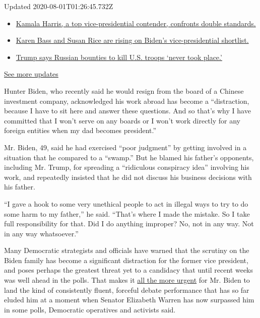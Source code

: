 Updated 2020-08-01T01:26:45.732Z

\begin{itemize}
\tightlist
\item
  \href{https://www.nytimes.com/2020/07/31/us/elections/biden-vs-trump.html?action=click\&pgtype=Article\&state=default\&region=MAIN_CONTENT_1\&context=storylines_live_updates\#link-29fdff45}{Kamala
  Harris, a top vice-presidential contender, confronts double
  standards.}
\item
  \href{https://www.nytimes.com/2020/07/31/us/elections/biden-vs-trump.html?action=click\&pgtype=Article\&state=default\&region=MAIN_CONTENT_1\&context=storylines_live_updates\#link-13ec3d9c}{Karen
  Bass and Susan Rice are rising on Biden's vice-presidential
  shortlist.}
\item
  \href{https://www.nytimes.com/2020/07/31/us/elections/biden-vs-trump.html?action=click\&pgtype=Article\&state=default\&region=MAIN_CONTENT_1\&context=storylines_live_updates\#link-49e9a016}{Trump
  says Russian bounties to kill U.S. troops `never took place.'}
\end{itemize}

\href{https://www.nytimes.com/2020/07/31/us/elections/biden-vs-trump.html?action=click\&pgtype=Article\&state=default\&region=MAIN_CONTENT_1\&context=storylines_live_updates}{See
more updates}

Hunter Biden, who recently said he would resign from the board of a
Chinese investment company, acknowledged his work abroad has become a
``distraction, because I have to sit here and answer these questions.
And so that's why I have committed that I won't serve on any boards or I
won't work directly for any foreign entities when my dad becomes
president.''

Mr. Biden, 49, said he had exercised ``poor judgment'' by getting
involved in a situation that he compared to a ``swamp.'' But he blamed
his father's opponents, including Mr. Trump, for spreading a
``ridiculous conspiracy idea'' involving his work, and repeatedly
insisted that he did not discuss his business decisions with his father.

``I gave a hook to some very unethical people to act in illegal ways to
try to do some harm to my father,'' he said. ``That's where I made the
mistake. So I take full responsibility for that. Did I do anything
improper? No, not in any way. Not in any way whatsoever.''

Many Democratic strategists and officials have warned that the scrutiny
on the Biden family has become a significant distraction for the former
vice president, and poses perhaps the greatest threat yet to a candidacy
that until recent weeks was well ahead in the polls. That makes it
\href{https://www.nytimes.com/2019/10/14/us/politics/joe-biden-democratic-debate.html}{all
the more urgent} for Mr. Biden to land the kind of consistently fluent,
forceful debate performance that has so far eluded him at a moment when
Senator Elizabeth Warren has now surpassed him in some polls, Democratic
operatives and activists said.

